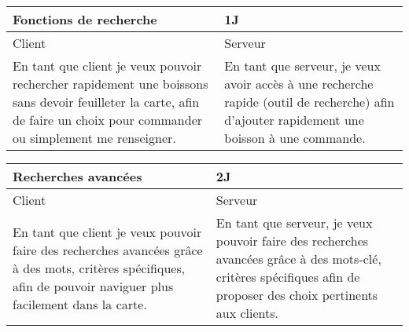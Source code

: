 \begin{center}
	\begin{tabular}{lll}
		\hline
			\multicolumn{2}{|p{14cm}}{Fonctions de recherche} & \multicolumn{1}{|p{0.7cm}|}{1J}\\
		\hline
			\multicolumn{1}{|p{7cm}}{Client} & \multicolumn{2}{|p{7cm}|}{Serveur}\\ 
		\hline
			\multicolumn{1}{|p{7cm}}{En tant que client je veux pouvoir rechercher
			rapidement une boissons sans devoir feuilleter la carte, afin de faire
			un choix pour commander ou simplement me renseigner.} 
			& \multicolumn{2}{|p{7cm}|}{En tant que serveur, je veux avoir accès 
			à une recherche rapide (outil de recherche) afin d'ajouter rapidement 
			une boisson à une commande.}\\ 
		\hline
	\end{tabular}

	\vspace{1cm}
	
	\begin{tabular}{lll}
		\hline
			\multicolumn{2}{|p{14cm}}{Recherches avancées} & \multicolumn{1}{|p{0.7cm}|}{2J} \\
		\hline
			\multicolumn{1}{|p{7cm}}{Client} & \multicolumn{2}{|p{7cm}|}{Serveur} \\ 
		\hline
			\multicolumn{1}{|p{7cm}}{En tant que client je veux pouvoir faire des
			recherches avancées grâce à des mots, critères spécifiques, afin de
			pouvoir naviguer plus facilement dans la carte.} 
			& \multicolumn{2}{|p{7cm}|}{En tant que serveur, je veux pouvoir faire
			des recherches avancées grâce à des mots-clé, critères spécifiques afin
			de proposer des choix pertinents aux clients.} \\ 
		\hline
	\end{tabular}
\end{center}

